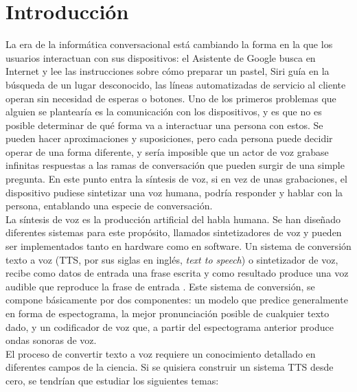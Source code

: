 \chapter*{Introducción}\label{chapter:introduction}

La era de la informática conversacional está cambiando la forma en la que los usuarios interactuan con sus dispositivos: el Asistente de Google busca en Internet y lee las instrucciones sobre cómo preparar un pastel, Siri guía en la búsqueda de un lugar desconocido, las líneas automatizadas de servicio al cliente operan sin necesidad de esperas o botones. Uno de los primeros problemas que alguien se plantearía es la comunicación con los dispositivos, y es que no es posible determinar de qué forma va a
interactuar una persona con estos. Se pueden hacer aproximaciones y suposiciones, pero cada persona puede decidir operar de una forma diferente, y sería imposible que un actor de voz grabase infinitas respuestas a las ramas de conversación que pueden surgir de una simple pregunta. En este punto entra la síntesis de voz, si en vez de unas grabaciones, el dispositivo pudiese sintetizar una voz humana, podría responder y hablar con la persona, entablando una especie de conversación.\\


La síntesis de voz es la producción artificial del habla humana. Se han diseñado diferentes sistemas para este propósito, llamados sintetizadores de voz y pueden ser implementados tanto en hardware como en software. Un sistema de conversión texto a voz (TTS, por sus siglas en inglés, \textit{text to speech}) o sintetizador de voz, recibe como datos de entrada una frase escrita y como resultado produce una voz audible que reproduce la frase de entrada . Este sistema de conversión, se compone básicamente por dos componentes: un modelo que predice generalmente en forma de espectograma, la mejor pronunciación posible de cualquier texto dado, y un codificador de voz que, a partir del espectograma anterior produce ondas sonoras de voz.\\

El proceso de convertir texto a voz requiere un conocimiento
detallado en diferentes campos de la ciencia. Si se quisiera construir un sistema TTS desde cero, se tendrían que estudiar los siguientes temas:

